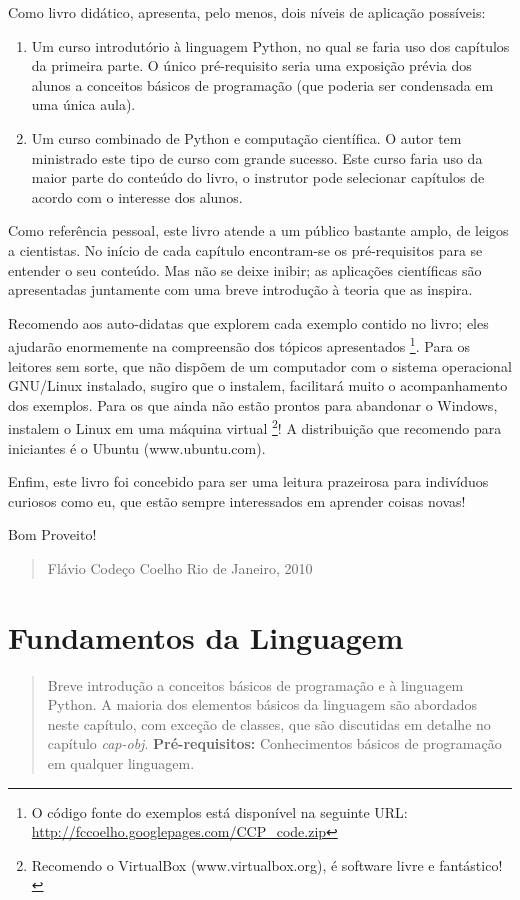\documentclass[a4paper,10pt,portuguese]{sphinxmanual}
\begin{document}
Como livro didático, apresenta, pelo menos, dois níveis de
aplicação possíveis:
\begin{enumerate}
\item {} 
Um curso introdutório à linguagem Python, no qual se faria uso dos
capítulos da primeira parte. O único pré-requisito seria uma
exposição prévia dos alunos a conceitos básicos de programação (que
poderia ser condensada em uma única aula).

\item {} 
Um curso combinado de Python e computação científica. O autor tem
ministrado este tipo de curso com grande sucesso. Este curso faria
uso da maior parte do conteúdo do livro, o instrutor pode
selecionar capítulos de acordo com o interesse dos alunos.

\end{enumerate}

Como referência pessoal, este livro atende a um público bastante
amplo, de leigos a cientistas. No início de cada capítulo
encontram-se os pré-requisitos para se entender o seu conteúdo. Mas
não se deixe inibir; as aplicações científicas são apresentadas
juntamente com uma breve introdução à teoria que as inspira.

Recomendo aos auto-didatas que explorem cada exemplo contido no
livro; eles ajudarão enormemente na compreensão dos tópicos
apresentados \footnote{
O código fonte do exemplos está disponível na seguinte URL:
\href{http://fccoelho.googlepages.com/CCP\_code.zip}{http://fccoelho.googlepages.com/CCP\_code.zip}
}. Para os leitores sem sorte, que não dispõem de
um computador com o sistema operacional GNU/Linux instalado, sugiro
que o instalem, facilitará muito o acompanhamento dos exemplos.
Para os que ainda não estão prontos para abandonar o Windows,
instalem o Linux em uma máquina virtual \footnote{
Recomendo o VirtualBox (www.virtualbox.org), é software livre e
fantástico!
}! A distribuição que
recomendo para iniciantes é o Ubuntu (www.ubuntu.com).

Enfim, este livro foi concebido para ser uma leitura prazeirosa
para indivíduos curiosos como eu, que estão sempre interessados em
aprender coisas novas!

Bom Proveito!
\begin{quote}

Flávio Codeço Coelho
Rio de Janeiro, 2010
\end{quote}


\chapter{Fundamentos da Linguagem}
\label{Cap2:fundamentos-da-linguagem}\label{Cap2:cap-fundamentos}\label{Cap2::doc}\begin{quote}

Breve introdução a conceitos básicos de programação e à linguagem Python. A maioria dos elementos básicos da linguagem são abordados neste capítulo, com exceção de classes, que são discutidas em detalhe no capítulo \emph{cap-obj}. \textbf{Pré-requisitos:} Conhecimentos básicos de programação em qualquer linguagem.
\end{quote}
\end{document}
